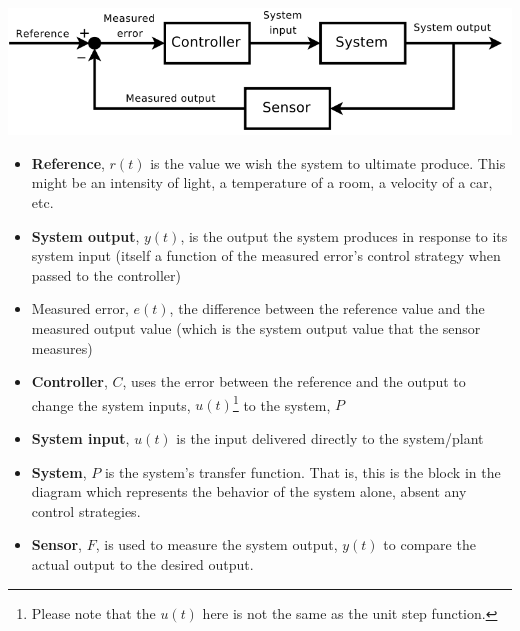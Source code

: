 \documentclass[11pt]{book}
\begin{document}
\includegraphics[width = \textwidth]{figures/16.01.png}
\begin{itemize}
	\item \textbf{Reference}, $r(t)$ is the value we wish the system to ultimate produce. This might be an intensity of light, a temperature of a room, a velocity of a car, etc.
	\item \textbf{System output}, $y(t)$,  is the output the system produces in response to its system input (itself a function of the measured error's control strategy when passed to the controller)
	\item Measured error, $e(t)$, the difference between the reference value and the measured output value (which is the system output value that the sensor measures)
	\item \textbf{Controller}, $C$, uses the error between the reference and the output to change the system inputs, $u(t)$\footnote{Please note that the $u(t)$ here is not the same as the unit step function.} to the system, $P$
	\item \textbf{System input}, $u(t)$ is the input delivered directly to the system/plant
	\item \textbf{System}, $P$ is the system's transfer function. That is, this is the block in the diagram which represents the behavior of the system alone, absent any control strategies.
	\item \textbf{Sensor}, $F$, is used to measure the system output, $y(t)$ to compare the actual output to the desired output.
\end{itemize}
\end{document}
